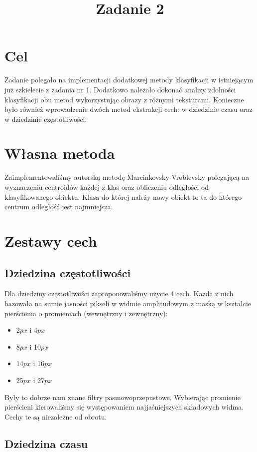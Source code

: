 \documentclass{classrep}
\author{
  \studentinfo{Hubert Marcinkowski}{214942} \and
  \studentinfo{Artur Wróblewski}{214985}
}
\title{Zadanie 2}
\begin{document}
\maketitle


\section{Cel}
Zadanie polegało na implementacji dodatkowej metody klasyfikacji w istniejącym już szkielecie z zadania nr 1. Dodatkowo należało dokonać analizy zdolności klasyfikacji obu metod wykorzystując obrazy z różnymi teksturami. Konieczne było również wprowadzenie dwóch metod ekstrakcji cech: w dziedzinie czasu oraz w dziedzinie częstotliwości.

\section{Własna metoda}
Zaimplementowaliśmy autorską metodę Marcinkovsky-Vroblevsky polegającą na wyznaczeniu centroidów każdej z klas oraz obliczeniu odległości od klasyfikowanego obiektu. Klasa do której należy nowy obiekt to ta do którego centrum odległość jest najmniejsza.

\section{Zestawy cech}

\subsection{Dziedzina częstotliwości}

Dla dziedziny częstotliwości zaproponowaliśmy użycie 4 cech. Każda z nich bazowała na sumie jasności pikseli w widmie amplitudowym z maską w kształcie pierścienia o promieniach (wewnętrzny i zewnętrzny):
\begin{itemize}
\item 2$px$ i 4$px$
\item 8$px$ i 10$px$
\item 14$px$ i 16$px$
\item 25$px$ i 27$px$
\end{itemize}

Były to dobrze nam znane filtry pasmowoprzepustowe. Wybierając promienie pierścieni kierowaliśmy się występowaniem najjaśniejszych składowych widma. Cechy te są niezależne od obrotu.

\subsection{Dziedzina czasu}
\end{document}
